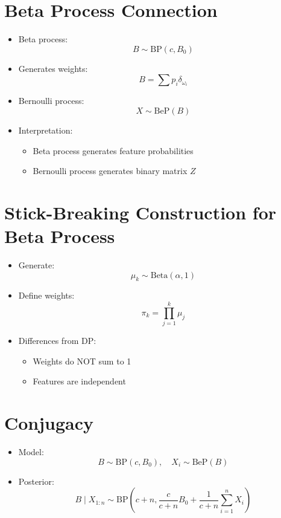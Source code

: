 \documentclass[12pt,oneside]{book}
\numberwithin{equation}{section}
\theoremstyle{definition}
\theoremstyle{plain}
\theoremstyle{remark}
\begin{document}
\section*{Beta Process Connection}

\begin{itemize}
\item Beta process:
\[
B \sim \text{BP}(c, B_0)
\]

\item Generates weights:
\[
B = \sum p_i \delta_{\omega_i}
\]

\item Bernoulli process:
\[
X \sim \text{BeP}(B)
\]

\item Interpretation:
\begin{itemize}
\item Beta process generates feature probabilities
\item Bernoulli process generates binary matrix $Z$
\end{itemize}
\end{itemize}

\section*{Stick-Breaking Construction for Beta Process}

\begin{itemize}
\item Generate:
\[
\mu_k \sim \text{Beta}(\alpha,1)
\]

\item Define weights:
\[
\pi_k = \prod_{j=1}^k \mu_j
\]

\item Differences from DP:
\begin{itemize}
\item Weights do NOT sum to 1
\item Features are independent
\end{itemize}
\end{itemize}

\section*{Conjugacy}

\begin{itemize}
\item Model:
\[
B \sim \text{BP}(c, B_0), \quad X_i \sim \text{BeP}(B)
\]

\item Posterior:
\[
B \mid X_{1:n}
\sim
\text{BP}\left(c+n, \frac{c}{c+n}B_0 + \frac{1}{c+n}\sum_{i=1}^n X_i\right)
\]
\end{itemize}
\end{document}
